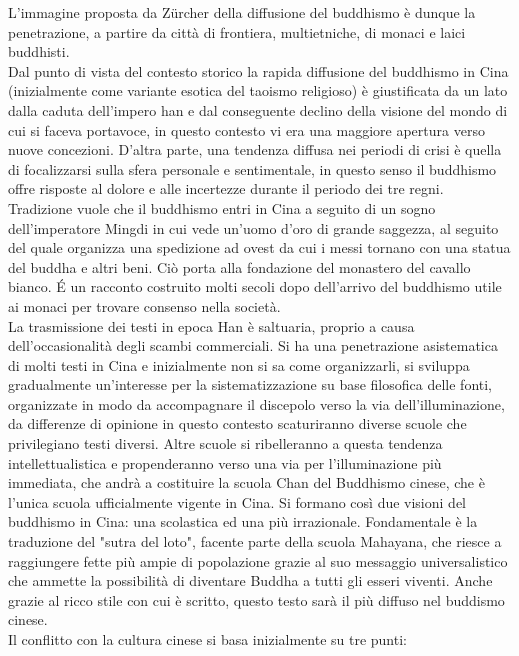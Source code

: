 \documentclass[10pt,a4paper]{report}
\begin{document}
L'immagine proposta da Z\"{u}rcher della diffusione del buddhismo è dunque la penetrazione, a partire da città di frontiera, multietniche, di monaci e laici buddhisti.\\
Dal punto di vista del contesto storico la rapida diffusione del buddhismo in Cina (inizialmente come variante esotica del taoismo religioso) è giustificata da un lato dalla caduta dell'impero han e dal conseguente declino della visione del mondo di cui si faceva portavoce, in questo contesto vi era una maggiore apertura verso nuove concezioni. D'altra parte, una tendenza diffusa nei periodi di crisi è quella di focalizzarsi sulla sfera personale e sentimentale, in questo senso il buddhismo offre risposte al dolore e alle incertezze durante il periodo dei tre regni.  Tradizione vuole che il buddhismo entri in Cina a seguito di un sogno dell'imperatore Mingdi in cui vede un'uomo d'oro di grande saggezza, al seguito del quale organizza una spedizione ad ovest da cui i messi tornano con una statua del buddha e altri beni. Ciò porta alla fondazione del monastero del cavallo bianco. \'E un racconto costruito molti secoli dopo dell'arrivo del buddhismo utile ai monaci per trovare consenso nella società.\\
La trasmissione dei testi in epoca Han è saltuaria, proprio a causa dell'occasionalità degli scambi commerciali. Si ha una penetrazione asistematica di molti testi in Cina e inizialmente non si sa come organizzarli, si sviluppa gradualmente un'interesse per la sistematizzazione su base filosofica delle fonti, organizzate in modo da accompagnare il discepolo verso la via dell'illuminazione, da differenze di opinione in questo contesto scaturiranno diverse scuole che privilegiano testi diversi. Altre scuole si ribelleranno a questa tendenza intellettualistica e propenderanno verso una via per l'illuminazione più immediata, che andrà a costituire la scuola Chan del Buddhismo cinese, che è l'unica scuola ufficialmente vigente in Cina. Si formano così due visioni del buddhismo in Cina: una scolastica ed una più irrazionale. Fondamentale è la traduzione del "sutra del loto", facente parte della scuola Mahayana, che riesce a raggiungere fette più ampie di popolazione grazie al suo messaggio universalistico che ammette la possibilità di diventare Buddha a tutti gli esseri viventi. Anche grazie al ricco stile con cui è scritto, questo testo sarà il più diffuso nel buddismo cinese.\\
Il conflitto con la cultura cinese si basa inizialmente su tre punti:
\end{document}

